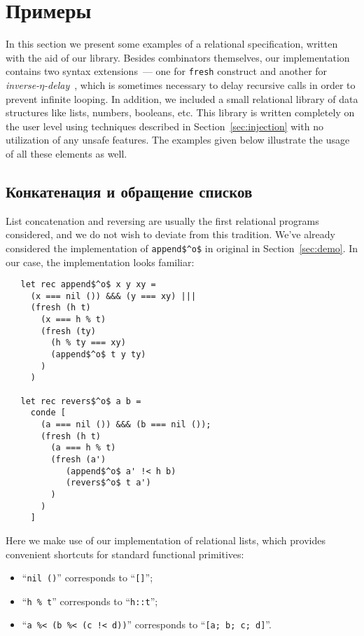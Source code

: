 \section{Примеры}
\label{sec:examples}

In this section we present some examples of a relational specification, written with the aid of our library.
Besides \miniKanren combinators themselves, our implementation contains two syntax extensions~--- one
for \lstinline|fresh| construct and another for \emph{inverse-$\eta$-delay}~\cite{MicroKanren}, which is
sometimes necessary to delay recursive calls in order to prevent infinite looping. In addition, we included a
small relational library of data structures like lists, numbers, booleans, etc. This library is written
completely on the user level using techniques described in Section~\ref{sec:injection} with no utilization
of any unsafe features. The examples given below illustrate the usage of all these elements as well.

\subsection{Конкатенация и обращение списков}

List concatenation and reversing are usually the first relational programs considered, and we do not wish
to deviate from this tradition. We've already considered the implementation of \lstinline|append$^o$| in
original \miniKanren in Section~\ref{sec:demo}. In our case, the implementation looks familiar:

\begin{lstlisting}
   let rec append$^o$ x y xy =
     (x === nil ()) &&& (y === xy) |||
     (fresh (h t)
       (x === h % t)
       (fresh (ty)
         (h % ty === xy)
         (append$^o$ t y ty)
       )
     )

   let rec revers$^o$ a b =
     conde [
       (a === nil ()) &&& (b === nil ());
       (fresh (h t)
         (a === h % t)
         (fresh (a')
            (append$^o$ a' !< h b)
            (revers$^o$ t a')
         )
       )
     ]
\end{lstlisting}

Here we make use of our implementation of relational lists, which provides convenient shortcuts for
standard functional primitives:

\begin{itemize}
  \item ``\lstinline|nil ()|'' corresponds to ``\lstinline|[]|'';
  \item ``\lstinline|h % t|'' corresponds to ``\lstinline|h::t|'';
  \item ``\lstinline|a %< (b %< (c !< d))|'' corresponds to ``\lstinline|[a; b; c; d]|''.
\end{itemize}

